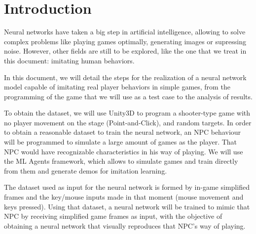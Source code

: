 %
%
%

\chapter{Introduction}

\minitoc{}

\bigskip{}

Neural networks have taken a big step in artificial intelligence, allowing to solve complex problems like playing games optimally, generating images or supressing noise. However, other fields are still to be explored, like the one that we treat in this document: imitating human behaviors.

In this document, we will detail the steps for the realization of a neural network model capable of imitating real player behaviors in simple games, from the programming of the game that we will use as a test case to the analysis of results.

To obtain the dataset, we will use Unity3D to program a shooter-type game with no player movement on the stage (Point-and-Click), and random targets. In order to obtain a reasonable dataset to train the neural network, an NPC behaviour will be programmed to simulate a large amount of games as the player. That NPC would have recognizable characteristics in his way of playing. We will use the ML Agents framework, which allows to simulate games and train directly from them and generate demos for imitation learning.

The dataset used as input for the neural network is formed by in-game simplified frames and the key/mouse inputs made in that moment (mouse movement and keys pressed). Using that dataset, a neural network will be trained to mimic that NPC by receiving simplified game frames as input, with the objective of obtaining a neural network that visually reproduces that NPC’s way of playing.


